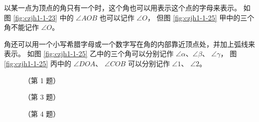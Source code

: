 以某一点为顶点的角只有一个时，这个角也可以用表示这个点的字母来表示。
如图 \ref{fig:czjh1-1-23} 中的 $\angle AOB$ 也可以记作 $\angle O$，
但图 \ref{fig:czjh1-1-25} 甲中的三个角不能记作 $\angle O$。


角还可以用一个小写希腊字母或一个数字写在角的内部靠近顶点处，并加上弧线来表示。
如图 \ref{fig:czjh1-1-25} 乙中的三个角可以分别记作 $\angle \alpha$、$\angle \beta$、 $\angle \gamma$，
  图 \ref{fig:czjh1-1-25} 丙中的 $\angle DOA$、 $\angle COB$ 可以分别记作 $\angle 1$、 $\angle 2$。



\begin{lianxi}


\begin{figure}[htbp]
    \centering
    \begin{minipage}[b]{4cm}
        \centering
        
        \caption*{（第 1 题）}
    \end{minipage}
    \qquad
    \begin{minipage}[b]{4cm}
        \centering
        
        \caption*{（第 3 题）}
    \end{minipage}
    \begin{minipage}[b]{4cm}
        \centering
        
        \caption*{（第 4 题）}
    \end{minipage}
\end{figure}



\xiaoti{}%
\begin{xiaoxiaotis}%


\end{xiaoxiaotis}

\end{lianxi}

